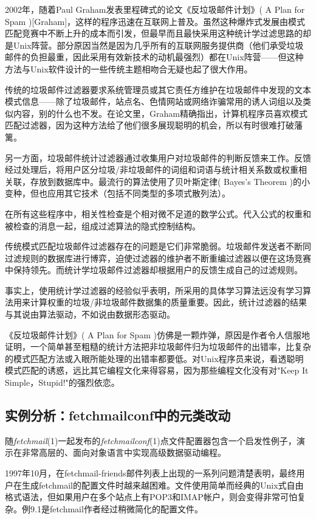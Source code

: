 \documentclass[12pt,oneside]{book}
\begin{document}
\begin{common-format}
2002年，随着Paul Graham发表里程碑式的论文《反垃圾邮件计划》( A Plan for Spam )[Graham]，这样的程序迅速在互联网上普及。虽然这种爆炸式发展由模式匹配竞赛中不断上升的成本而引发，但最早而且最快采用这种统计学过滤思路的却是Unix阵营。部分原因当然是因为几乎所有的互联网服务提供商（他们承受垃圾邮件的负担最重，因此采用有效新技术的动机最强烈）都在Unix阵营——但这种方法与Unix软件设计的一些传统主题相吻合无疑也起了很大作用。

传统的垃圾邮件过滤器要求系统管理员或其它责任方维护在垃圾邮件中发现的文本模式信息——除了垃圾邮件，站点名、色情网站或网络诈骗常用的诱人词组以及类似内容，别的什么也不发。在论文里，Graham精确指出，计算机程序员喜欢模式匹配过滤器，因为这种方法给了他们很多展现聪明的机会，所以有时很难打破藩篱。

另一方面，垃圾邮件统计过滤器通过收集用户对垃圾邮件的判断反馈来工作。反馈经过处理后，将用户区分垃圾/非垃圾邮件的词组和词语与统计相关系数或权重相关联，存放到数据库中。最流行的算法使用了贝叶斯定律( Bayes's Theorem )的小变种，但也应用其它技术（包括不同类型的多项式散列法）。

在所有这些程序中，相关性检查是个相对微不足道的数学公式。代入公式的权重和被检查的消息一起，组成过滤算法的隐式控制结构。

传统模式匹配垃圾邮件过滤器存在的问题是它们非常脆弱。垃圾邮件发送者不断同过滤规则的数据库进行博弈，迫使过滤器的维护者不断重编过滤器以便在这场竞赛中保持领先。而统计学垃圾邮件过滤器却根据用户的反馈生成自己的过滤规则。

事实上，使用统计学过滤器的经验似乎表明，所采用的具体学习算法远没有学习算法用来计算权重的垃圾/非垃圾邮件数据集的质量重要。因此，统计过滤器的结果与其说由算法驱动，不如说由数据形态驱动。

《反垃圾邮件计划》( A Plan for Spam )仿佛是一颗炸弹，原因是作者令人信服地证明，一个简单甚至粗糙的统计方法把非垃圾邮件归为垃圾邮件的出错率，比复杂的模式匹配方法或入眼所能处理的出错率都要低。对Unix程序员来说，看透聪明模式匹配的诱惑，远比其它编程文化来得容易，因为那些编程文化没有对"Keep It Simple，Stupid!"的强烈依恋。

\subsection{实例分析：fetchmailconf中的元类改动}
随\textit{fetchmail}(1)一起发布的\textit{fetchmailconf}(1)点文件配置器包含一个启发性例子，演示在非常高层的、面向对象语言中实现高级数据驱动编程。

1997年10月，在fetchmail-friends邮件列表上出现的一系列问题清楚表明，最终用户在生成fetchmail的配置文件时越来越困难。文件使用简单而经典的Unix式自由格式语法，但如果用户在多个站点上有POP3和IMAP帐户，则会变得非常可怕复杂。例9.1是fetchmail作者经过稍微简化的配置文件。




\end{common-format}
\end{document}
